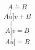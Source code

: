 \documentclass{article}
\begin{document}
\[ A \stackrel{v}{=} B \]
\[ A \stackrel[u]{v}{+} B \]
\[ A \stackrel[]{v}{=} B \]
\[ A \stackrel[u]{}{=} B \]
\end{document}
